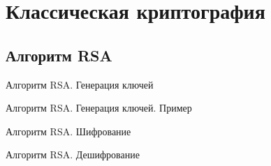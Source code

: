 \section{Классическая криптография}
\subsection{Алгоритм RSA}
\begin{frame}{Алгоритм RSA. Генерация ключей}

\end{frame}
\begin{frame}{Алгоритм RSA. Генерация ключей. Пример}

\end{frame}
\begin{frame}{Алгоритм RSA. Шифрование}

\end{frame}
\begin{frame}{Алгоритм RSA. Дешифрование}

\end{frame}

